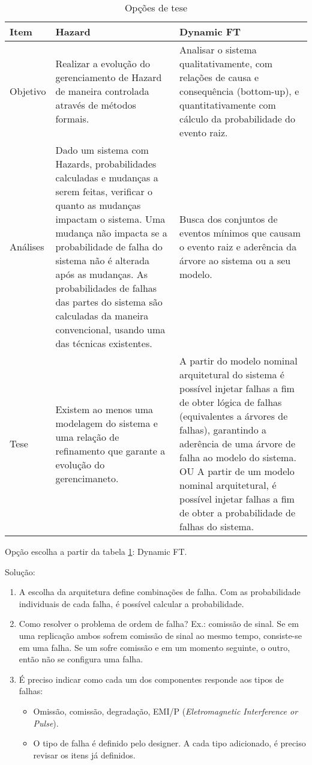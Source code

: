 
\begin{table}
\begin{center}
\begin{tabular}{l|p{6.5cm}|p{6.5cm}}
Item & Hazard & Dynamic FT\\
\hline
\hline
Objetivo 
  & Realizar a evolução do gerenciamento de Hazard de maneira controlada através de métodos formais. 
  & Analisar o sistema qualitativamente, com relações de causa e consequência (bottom-up), e quantitativamente com cálculo da probabilidade do evento raiz.\\
\hline
Análises 
  & Dado um sistema com Hazards, probabilidades calculadas e mudanças a serem feitas, verificar o quanto as mudanças impactam o sistema. Uma mudança não impacta se a probabilidade de falha do sistema não é alterada após as mudanças. As probabilidades de falhas das partes do sistema são calculadas da maneira convencional, usando uma das técnicas existentes. 
  & Busca dos conjuntos de eventos mínimos que causam o evento raiz e aderência da árvore ao sistema ou a seu modelo. \\
\hline
Tese 
  & Existem ao menos uma modelagem do sistema e uma relação de refinamento que garante a evolução do gerencimaneto. 
  & A partir do modelo nominal arquitetural do sistema é possível injetar falhas a fim de obter lógica de falhas (equivalentes a árvores de falhas), garantindo a aderência de uma árvore de falha ao modelo do sistema. OU A partir de um modelo nominal arquitetural, é possível injetar falhas a fim de obter a probabilidade de falhas do sistema.\\
\hline
\end{tabular}
\end{center}
\caption{Opções de tese}
\label{tbl:thesis-decision}
\end{table}

Opção escolha a partir da tabela \cref{tbl:thesis-decision}: Dynamic FT.

Solução:
\begin{enumerate}
  \item A escolha da arquitetura define combinações de falha. Com as probabilidade individuais de cada falha, é possível calcular a probabilidade. 
  \item Como resolver o problema de ordem de falha? Ex.: comissão de sinal. Se em uma replicação ambos sofrem comissão de sinal ao mesmo tempo, consiste-se em uma falha. Se um sofre comissão e em um momento seguinte, o outro, então não se configura uma falha.
  \item É preciso indicar como cada um dos componentes responde aos tipos de falhas:
  \begin{itemize}
    \item Omissão, comissão, degradação, EMI/P (\emph{Eletromagnetic Interference or Pulse}).
    \item O tipo de falha é definido pelo designer. A cada tipo adicionado, é preciso revisar os itens já definidos.
  \end{itemize}

\end{enumerate}